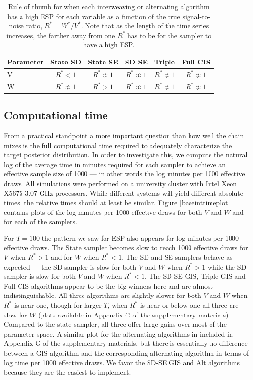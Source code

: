 \documentclass[12pt]{article}
\begin{document}
\begin{table}
  \centering
  \begin{tabular}{|l|ccccc|}\hline
    Parameter & State-SD        & State-SE       & SD-SE        & Triple            & Full CIS \\\hline
    V         & $R^* < 1$           & $R^* \not\approx 1$ & $R^* \not\approx 1$ & $R^* \not\approx 1$ & $R^* \not\approx 1$ \\
    W         & $R^* \not\approx 1$ & $R^* > 1$           & $R^* \not\approx 1$ & $R^* \not\approx 1$ & $R^* \not\approx 1$\\\hline
  \end{tabular}
  \caption{Rule of thumb for when each interweaving or alternating algorithm has a high ESP for each variable as a function of the true signal-to-noise ratio, $R^*=W^*/V^*$. Note that as the length of the time series increases, the farther away from one $R^*$ has to be for the sampler to have a high ESP.}
  \label{tab:stnmix2}
\end{table}

\subsection{Computational time}\label{sec:LLM:time}

From a practical standpoint a more important question than how well the chain mixes is the full computational time required to adequately characterize the target posterior distribution. In order to investigate this, we compute the natural log of the average time in minutes required for each sampler to achieve an effective sample size of 1000 --- in other words the log minutes per 1000 effective draws. All simulations were performed on a university cluster with Intel Xeon X5675 3.07 GHz processors. While different systems will yield different absolute times, the relative times should at least be similar. Figure \ref{baseinttimeplot} contains plots of the log minutes per 1000 effective draws for both $V$ and $W$ and for each of the samplers.

For $T=100$ the pattern we saw for ESP also appears for log minutes per 1000 effective draws. The State sampler becomes slow to reach 1000 effective draws for $V$ when $R^*>1$ and for $W$ when $R^*<1$. The SD and SE samplers behave as expected --- the SD sampler is slow for both $V$ and $W$ when $R^*>1$ while the SD sampler is slow for both $V$ and $W$ when $R^*<1$. The SD-SE GIS, Triple GIS and Full CIS algorithms appear to be the big winners here and are almost indistinguishable. All three algorithms are slightly slower for both $V$ and $W$ when $R^*$ is near one, though for larger $T$,  when $R^*$ is near or below one all three are slow for $W$ (plots available in Appendix G of the supplementary materials). Compared to the state sampler, all three offer large gains over most of the parameter space. A similar plot for the alternating algorithms in included in Appendix G of the supplementary materials, but there is essentially no difference between a GIS algorithm and the corresponding alternating algorithm in terms of log time per 1000 effective draws. We favor the SD-SE GIS and Alt algorithms because they are the easiest to implement.
\end{document}
